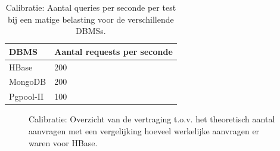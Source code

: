 \begin{table}[h!]
	\centering
	\begin{tabular}{l| l }
		\textbf{\gls{DBMS}} & Aantal requests per seconde \\
		\hline
		HBase & 200 \\
		MongoDB & 200\\
		Pgpool-II & 100\\
	\end{tabular}
	\caption{Calibratie: Aantal queries per seconde per test bij een matige belasting voor de verschillende \glspl{DBMS}.}
	\label{table:calibratie-queriesperseconde-resultaat}
\end{table}

\begin{figure}[h!] 
	\centering
	\caption{Calibratie: Overzicht van de vertraging t.o.v. het theoretisch aantal aanvragen met een vergelijking hoeveel werkelijke aanvragen er waren voor HBase. }
	\label{fig:calibratie-queriesperseconde-hbase}
\end{figure}

